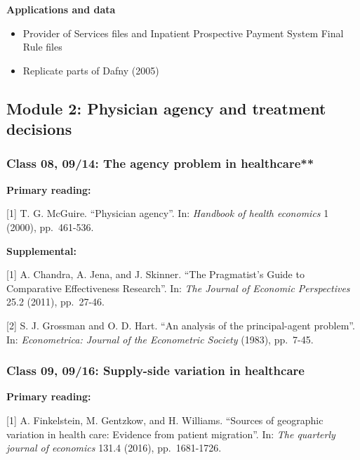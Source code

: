 \documentclass[11pt,]{article}
\providecommand{\tightlist}{%
  \setlength{\itemsep}{0pt}\setlength{\parskip}{0pt}}
\begin{document}
\textbf{Applications and data}

\begin{itemize}
\tightlist
\item
  Provider of Services files and Inpatient Prospective Payment System
  Final Rule files
\item
  Replicate parts of Dafny (2005)
\end{itemize}

\hypertarget{module-2-physician-agency-and-treatment-decisions}{%
\subsection{Module 2: Physician agency and treatment
decisions}\label{module-2-physician-agency-and-treatment-decisions}}

\hypertarget{class-08-0914-the-agency-problem-in-healthcare}{%
\subsubsection{Class 08, 09/14: The agency problem in
healthcare**}\label{class-08-0914-the-agency-problem-in-healthcare}}

\textbf{Primary reading:}

{[}1{]} T. G. McGuire. ``Physician agency''. In: \emph{Handbook of
health economics} 1 (2000), pp.~461-536.

\textbf{Supplemental:}

{[}1{]} A. Chandra, A. Jena, and J. Skinner. ``The Pragmatist's Guide to
Comparative Effectiveness Research''. In: \emph{The Journal of Economic
Perspectives} 25.2 (2011), pp.~27-46.

{[}2{]} S. J. Grossman and O. D. Hart. ``An analysis of the
principal-agent problem''. In: \emph{Econometrica: Journal of the
Econometric Society} (1983), pp.~7-45.

\hypertarget{class-09-0916-supply-side-variation-in-healthcare}{%
\subsubsection{Class 09, 09/16: Supply-side variation in
healthcare}\label{class-09-0916-supply-side-variation-in-healthcare}}

\textbf{Primary reading:}

{[}1{]} A. Finkelstein, M. Gentzkow, and H. Williams. ``Sources of
geographic variation in health care: Evidence from patient migration''.
In: \emph{The quarterly journal of economics} 131.4 (2016),
pp.~1681-1726.
\end{document}
